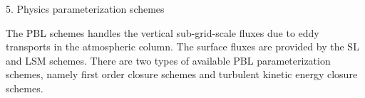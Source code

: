 \documentclass{beamer}
\begin{document}
\begin{frame}[fragile, allowframebreaks=1, t]{5. Physics parameterization schemes}
\begin{itemize}
	The PBL schemes handles the vertical sub-grid-scale fluxes due to eddy transports in the atmospheric column. The surface fluxes are provided by the SL and LSM schemes. There are two types of available PBL parameterization schemes, namely first order closure schemes and turbulent kinetic energy closure schemes.  
\end{itemize}
\end{frame}

\end{document}
